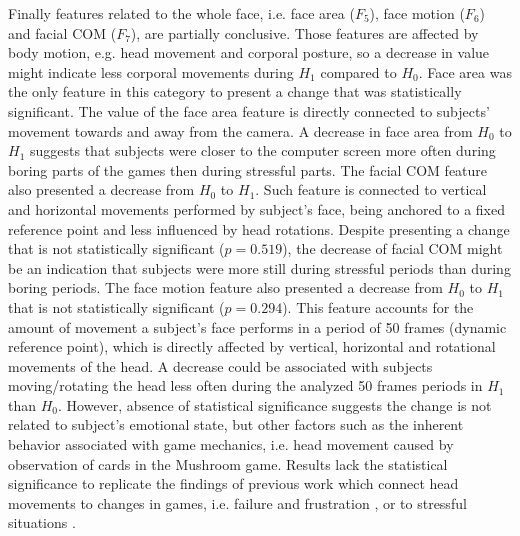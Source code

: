 Finally features related to the whole face, i.e. face area ($F_5$), face motion ($F_6$) and facial COM ($F_7$), are partially conclusive. Those features are affected by body motion, e.g. head movement and corporal posture, so a decrease in value might indicate less corporal movements during $H_1$ compared to $H_0$. Face area was the only feature in this category to present a change that was statistically significant. The value of the face area feature is directly connected to subjects' movement towards and away from the camera. A decrease in face area from $H_0$ to $H_1$ suggests that subjects were closer to the computer screen more often during boring parts of the games then during stressful parts. The facial COM feature also presented a decrease from $H_0$ to $H_1$. Such feature is connected to vertical and horizontal movements performed by subject's face, being anchored to a fixed reference point and less influenced by head rotations. Despite presenting a change that is not statistically significant ($p = 0.519$), the decrease of facial COM might be an indication that subjects were more still during stressful periods than during boring periods. The face motion feature also presented a decrease from $H_0$ to $H_1$ that is not statistically significant ($p = 0.294$). This feature accounts for the amount of movement a subject's face performs in a period of 50 frames (dynamic reference point), which is directly affected by vertical, horizontal and rotational movements of the head. A decrease could be associated with subjects moving/rotating the head less often during the analyzed 50 frames periods in $H_1$ than $H_0$. However, absence of statistical significance suggests the change is not related to subject's emotional state, but other factors such as the inherent behavior associated with game mechanics, i.e. head movement caused by observation of cards in the Mushroom game. Results lack the statistical significance to replicate the findings of previous work which connect head movements to changes in games, i.e. failure \parencite{shaker2011game} and frustration \parencite{blom2014towards}, or to stressful situations \parencite{giannakakis2017stress}.

